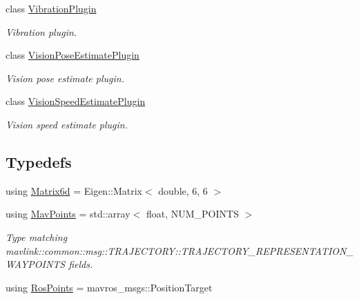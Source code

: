 \begin{DoxyCompactItemize}
class \mbox{\hyperlink{classmavros_1_1extra__plugins_1_1VibrationPlugin}{Vibration\+Plugin}}
\begin{DoxyCompactList}\small\item\em Vibration plugin. \end{DoxyCompactList}\item 
class \mbox{\hyperlink{classmavros_1_1extra__plugins_1_1VisionPoseEstimatePlugin}{Vision\+Pose\+Estimate\+Plugin}}
\begin{DoxyCompactList}\small\item\em Vision pose estimate plugin. \end{DoxyCompactList}\item 
class \mbox{\hyperlink{classmavros_1_1extra__plugins_1_1VisionSpeedEstimatePlugin}{Vision\+Speed\+Estimate\+Plugin}}
\begin{DoxyCompactList}\small\item\em Vision speed estimate plugin. \end{DoxyCompactList}\end{DoxyCompactItemize}
\subsection*{Typedefs}
\begin{DoxyCompactItemize}
\item 
using \mbox{\hyperlink{group__plugin_gaf27101661ecc1fbce6f79a56a3982327}{Matrix6d}} = Eigen\+::\+Matrix$<$ double, 6, 6 $>$
\item 
using \mbox{\hyperlink{group__plugin_gafae91f0662f199848c074fd4d2edd106}{Mav\+Points}} = std\+::array$<$ float, N\+U\+M\+\_\+\+P\+O\+I\+N\+TS $>$
\begin{DoxyCompactList}\small\item\em Type matching mavlink\+::common\+::msg\+::\+T\+R\+A\+J\+E\+C\+T\+O\+R\+Y\+::\+T\+R\+A\+J\+E\+C\+T\+O\+R\+Y\+\_\+\+R\+E\+P\+R\+E\+S\+E\+N\+T\+A\+T\+I\+O\+N\+\_\+\+W\+A\+Y\+P\+O\+I\+N\+TS fields. \end{DoxyCompactList}\item 
using \mbox{\hyperlink{group__plugin_ga93699d5632be3dfe1bb548ed5a0b4171}{Ros\+Points}} = mavros\+\_\+msgs\+::\+Position\+Target
\end{DoxyCompactItemize}
